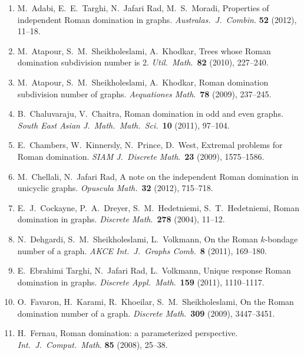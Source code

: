 \documentclass[12pt]{article}%
\begin{document}
\begin{enumerate}
\item M.~Adabi, E.~E.~Targhi, N.~Jafari Rad, M.~S.~Moradi, Properties of
independent Roman domination in graphs. \emph{Australas.~J.~Combin.
}\textbf{52} (2012), 11--18.

\item M.~Atapour, S.~M.~Sheikholeslami, A.~Khodkar, Trees whose Roman
domination subdivision number is 2. \emph{Util.~Math}.~\textbf{82} (2010), 227--240.

\item M.~Atapour, S.~M.~Sheikholeslami, A.~Khodkar, Roman domination
subdivision number of graphs. \emph{Aequationes Math}.~\textbf{78} (2009), 237--245.

\item B.~Chaluvaraju, V.~Chaitra, Roman domination in odd and even graphs.
\emph{South East Asian J.~Math.~Math.~Sci.}~\textbf{10} (2011), 97--104.

\item E.~Chambers, W.~Kinnersly, N.~Prince, D.~West, Extremal problems for
Roman domination. \emph{SIAM J.~Discrete Math}.~\textbf{23} (2009), 1575--1586.

\item M.~Chellali, N.~Jafari Rad, A note on the independent Roman domination
in unicyclic graphs. \emph{Opuscula Math.}~\textbf{32} (2012), 715--718.

\item E.~J.~Cockayne, P.~A.~Dreyer, S.~M.~Hedetniemi, S.~T.~Hedetniemi, Roman
domination in graphs. \emph{Discrete Math}.~\textbf{278 }(2004), 11--12.

\item N.~Dehgardi, S.~M.~Sheikholeslami, L.~Volkmann, On the Roman $k$-bondage
number of a graph. \emph{AKCE Int.~J.~Graphs Comb.}~\textbf{8} (2011), 169--180.

\item E.~Ebrahimi Targhi, N.~Jafari Rad, L.~Volkmann, Unique response Roman
domination in graphs. \emph{Discrete Appl.~Math}.~\textbf{159} (2011), 1110--1117.

\item O.~Favaron, H.~Karami, R.~Khoeilar, S.~M.~Sheikholeslami, On the Roman
domination number of a graph. \emph{Discrete Math}.~\textbf{309} (2009), 3447--3451.

\item H.~Fernau, Roman domination: a parameterized perspective.
\emph{Int.~J.~Comput.~Math}. \textbf{85} (2008), 25--38.


\end{enumerate}
\end{document}
